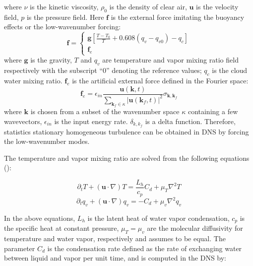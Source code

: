\documentclass[12pt]{article}
\begin{document}
where $\nu$ is the kinetic viscosity, $\rho_{0}$ is the density of
clear air, $\mathbf{u}$ is the velocity field, $p$ is the pressure field. Here $\mathbf{f}$ is the external force imitating the buoyancy effects or the low-wavenumber forcing:
\begin{equation}
\mathbf{f}= \left\{ 
\begin{array}{l}
\mathbf{g}[\frac{T-T_{0}}{T}+0.608(q_{v}-q_{v0})-q_{c}]\\
\mathbf{f}_e
\end{array} 
\right.
\label{eq:source_term}
\end{equation}
where $\mathbf{g}$ is the gravity, $T$ and $q_{v}$ are temperature
and vapor mixing ratio field respectively with the subscript ``$0$''
denoting the reference values; $q_{c}$ is the cloud water mixing
ratio. $\mathbf{f}_e$ is the artificial external force defined in the Fourier space:
\begin{equation}
\mathbf{f}_e = \epsilon_{in}\frac{\mathbf{u}(\mathbf{k},t)}
{\sum_{\mathbf{k}_f\in \kappa}|\mathbf{u}(\mathbf{k}_f,t)|^2}
\sigma_{\mathbf{k},\mathbf{k}_f}
\end{equation}
where $\mathbf{k}$ is chosen from a subset of the wavenumber space $\kappa$ containing a few wavevectors, $\epsilon_{in}$ is the input energy rate. $\delta_{k,k_f}$ is a delta function. Therefore, statistics stationary homogeneous turbulence 
can be obtained in DNS by forcing the low-wavenumber modes.

The temperature and vapor mixing ratio are solved from the following
equations (\cite{Kumar11}):

\begin{equation}
\partial_{t}T+(\mathbf{u}\cdot\nabla)T=\frac{L_{h}}{c_{p}}C_{d}+\mu_{T}\nabla^{2}T\label{eq:Temp}
\end{equation}
\begin{equation}
\partial_{t}q_{v}+(\mathbf{u}\cdot\nabla)q_{v}=-C_{d}+\mu_{v}\nabla^{2}q_{v}\label{eq:Vapor}
\end{equation}


In the above equations, $L_{h}$ is the latent heat of water vapor condensation,
$c_{p}$ is the specific heat at constant pressure, $\mu_{T}=\mu_{v}$ are
the molecular diffusivity for temperature and water vapor, respectively
and assumes to be equal. The parameter $C_{d}$ is the condensation
rate defined as the rate of exchanging water between liquid and vapor
per unit time, and is computed in the DNS by:
\end{document}
